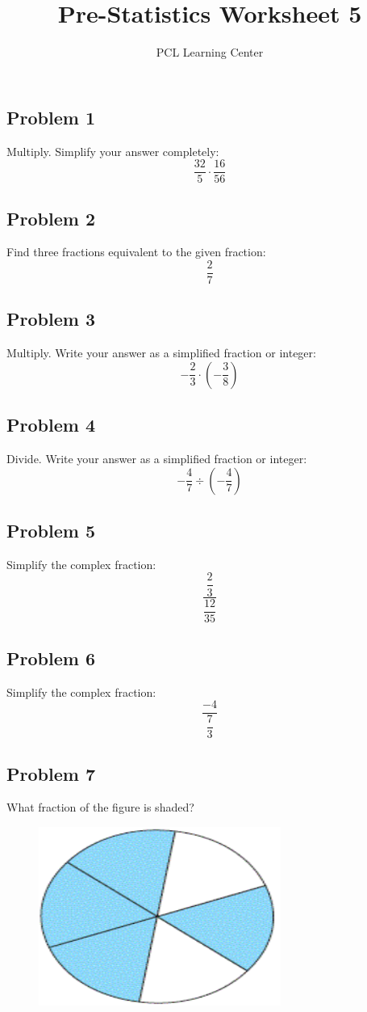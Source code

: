 \documentclass[12pt]{article}
\title{Pre-Statistics Worksheet 5}
\author{PCL Learning Center}
\date{}
\begin{document}
\maketitle

\subsection*{Problem 1}
Multiply. Simplify your answer completely:  
\[
\dfrac{32}{5} \cdot \dfrac{16}{56}
\]

\subsection*{Problem 2}
Find three fractions equivalent to the given fraction:  
\[
\dfrac{2}{7}
\]

\subsection*{Problem 3}
Multiply. Write your answer as a simplified fraction or integer:  
\[
-\dfrac{2}{3} \cdot \left(-\dfrac{3}{8}\right)
\]

\subsection*{Problem 4}
Divide. Write your answer as a simplified fraction or integer:  
\[
-\dfrac{4}{7} \div \left(-\dfrac{4}{7}\right)
\]

\subsection*{Problem 5}
Simplify the complex fraction:  
\[
\dfrac{\dfrac{2}{3}}{\dfrac{12}{35}}
\]

\subsection*{Problem 6}
Simplify the complex fraction:  
\[
\dfrac{-4}{\dfrac{7}{3}}
\]

\subsection*{Problem 7}
What fraction of the figure is shaded?  

\begin{figure}[!ht]
    \centering
    \includegraphics[width=0.5\linewidth]{1.png}
\end{figure}
\end{document}

